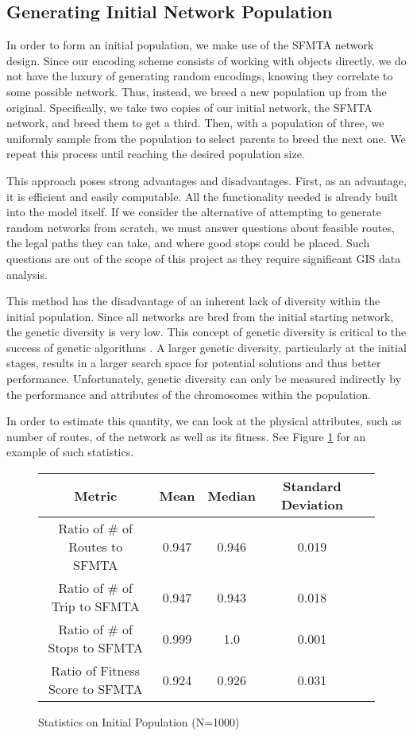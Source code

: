 \documentclass[11pt]{amsart}
\theoremstyle{definition}                  %
\theoremstyle{remark}                       %
\numberwithin{equation}{section}
\begin{document}
\subsection{Generating Initial Network Population}
In order to form an initial population, we make use of the SFMTA network design. Since our encoding scheme consists of working with objects directly, we do not have the luxury of generating random encodings, knowing they correlate to some possible network. Thus, instead, we breed a new population up from the original. Specifically, we take two copies of our initial network, the SFMTA network, and breed them to get a third. Then, with a population of three, we uniformly sample from the population to select parents to breed the next one. We repeat this process until reaching the desired population size. 

This approach poses strong advantages and disadvantages. First, as an advantage, it is efficient and easily computable. All the functionality needed is already built into the model itself. If we consider the alternative of attempting to generate random networks from scratch, we must answer questions about feasible routes, the legal paths they can take, and where good stops could be placed. Such questions are out of the scope of this project as they require significant GIS data analysis. 

This method has the disadvantage of an inherent lack of diversity within the initial population. Since all networks are bred from the initial starting network, the genetic diversity is very low. This concept of genetic diversity is critical to the success of genetic algorithms \cite{holland1992}. A larger genetic diversity, particularly at the initial stages, results in a larger search space for potential solutions and thus better performance. Unfortunately, genetic diversity can only be measured indirectly by the performance and attributes of the chromosomes within the population. 

 In order to estimate this quantity, we can look at the physical attributes, such as number of routes, of the network as well as its fitness. See Figure \ref{table:initial_pop_data} for an example of such statistics. 

\begin{figure}[h]
    \centering
    \begin{tabular}{|c|c|c|c|c|}
        \hline
        Metric & Mean & Median & Standard Deviation \\
         \hline
        Ratio of \# of Routes to SFMTA & 0.947 & 0.946 & 0.019 \\
        Ratio of \# of Trip to SFMTA & 0.947 & 0.943 & 0.018 \\
        Ratio of \# of Stops to SFMTA & 0.999 & 1.0 & 0.001 \\
        Ratio of Fitness Score to SFMTA & 0.924 & 0.926 & 0.031 \\
        \hline
    \end{tabular}
    \caption{Statistics on Initial Population (N=1000)}
    \label{table:initial_pop_data}
\end{figure}
\end{document}
